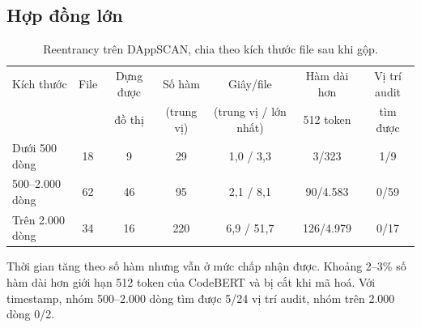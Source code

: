 \documentclass[12pt,a4paper]{article}
\begin{document}
\subsection{Hợp đồng lớn}
\begin{table}[H]\centering\small
\caption{Reentrancy trên DAppSCAN, chia theo kích thước file sau khi gộp.}\label{tab:size}
\begin{tabular}{lcccccc}
\toprule
Kích thước & File & Dựng được & Số hàm & Giây/file & Hàm dài hơn & Vị trí audit\\
 & & đồ thị & (trung vị) & (trung vị / lớn nhất) & 512 token & tìm được\\
\midrule
Dưới 500 dòng & 18 & 9 & 29 & 1{,}0 / 3{,}3 & 3/323 & 1/9\\
500--2.000 dòng & 62 & 46 & 95 & 2{,}1 / 8{,}1 & 90/4.583 & 0/59\\
Trên 2.000 dòng & 34 & 16 & 220 & 6{,}9 / 51{,}7 & 126/4.979 & 0/17\\
\bottomrule
\end{tabular}
\end{table}
Thời gian tăng theo số hàm nhưng vẫn ở mức chấp nhận được. Khoảng 2--3\% số hàm dài hơn giới hạn 512 token của CodeBERT và bị cắt khi mã hoá. Với timestamp, nhóm 500--2.000 dòng tìm được 5/24 vị trí audit, nhóm trên 2.000 dòng 0/2.
\end{document}
